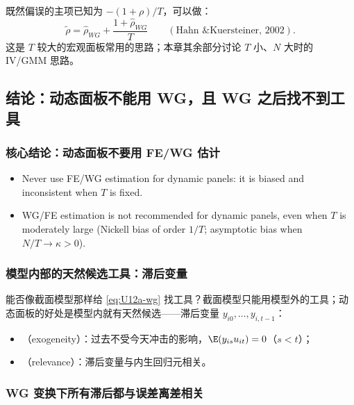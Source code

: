 \begin{extend}[偏误修正估计量]
既然偏误的主项已知为 $-(1+\rho)/T$，可以做：
\[
\tilde\rho=\hat\rho_{WG}+\frac{1+\hat\rho_{WG}}{T}\qquad(\text{Hahn \& Kuersteiner, 2002}).
\]
这是 $T$ 较大的宏观面板常用的思路；本章其余部分讨论 $T$ 小、$N$ 大时的 IV/GMM 思路。
\end{extend}

\subsection{结论：动态面板不能用 WG，且 WG 之后找不到工具}\label{sec:U12a-noiv}

\subsubsection{核心结论：动态面板不要用 FE/WG 估计}

\begin{keypt}[考场标准表述]
\begin{itemize}
  \item Never use FE/WG estimation for dynamic panels: it is biased and inconsistent when $T$ is fixed.
  \item WG/FE estimation is not recommended for dynamic panels, even when $T$ is moderately large (Nickell bias of order $1/T$; asymptotic bias when $N/T\to\kappa>0$).
\end{itemize}
\end{keypt}

\subsubsection{模型内部的天然候选工具：滞后变量}

能否像截面模型那样给 \eqref{eq:U12a-wg} 找工具？截面模型只能用模型外的工具；动态面板的好处是模型内就有天然候选——滞后变量 $y_{i0},\dots,y_{i,t-1}$：
\begin{itemize}
  \item {}（exogeneity）：过去不受今天冲击的影响，$\E(y_{is}u_{it})=0$（$s<t$）；
  \item {}（relevance）：滞后变量与内生回归元相关。
\end{itemize}

\subsubsection{WG 变换下所有滞后都与误差离差相关}

